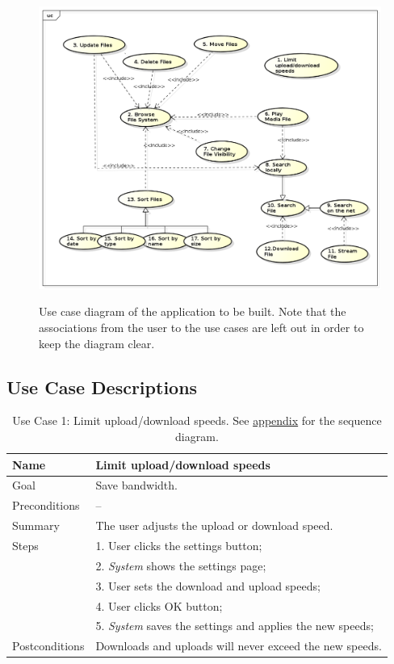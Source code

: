 \begin{center}
\begin{figure}[h]
	\centering
	\mbox{\includegraphics[width=1.2\textwidth]{Images/use_case.png}}
	\label{fig:use_case_diagram}
	\caption{Use case diagram of the application to be built.
	Note that the associations from the user to the use cases are left out in order to keep the diagram clear.}
\end{figure}
\end{center}

\clearpage
\subsection{Use Case Descriptions}
\label{sec:use_case_descriptions}

\begin{table}[h!]
\centering
\begin{tabular}{|l|l|}
\hline
Name & Limit upload/download speeds\\ \hline
Goal & Save bandwidth.\\ \hline
Preconditions & -- \\ \hline
Summary & The user adjusts the upload or download speed.\\ \hline
Steps &  1. User clicks the settings button; \\
      &  2. \textit{System} shows the settings page; \\
      &  3. User sets the download and upload speeds; \\
      &  4. User clicks OK button; \\
      &  5. \textit{System} saves the settings and applies the new speeds;
        \\ \hline
Postconditions & Downloads and uploads will never exceed the new speeds.
\\ \hline
\end{tabular}
\caption{Use Case 1: Limit upload/download speeds. See \hyperref[fig:req_seq1]{appendix} for the sequence diagram.}
\label{tab:UC1}
\end{table}

